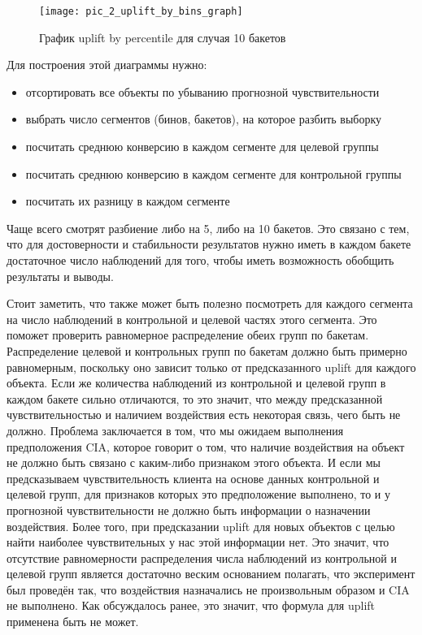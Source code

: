\begin{figure}[ht]
\centering
\texttt{[image: pic\_2\_uplift\_by\_bins\_graph]}
\centering
\caption{График uplift by percentile для случая 10 бакетов}
\label{fig:pic_2_uplift_by_bins_graph}
\end{figure}

Для построения этой диаграммы нужно:
\begin{itemize}
    \item отсортировать все объекты по убыванию прогнозной чувствительности
    \item выбрать число сегментов (бинов, бакетов), на которое разбить выборку
    \item посчитать среднюю конверсию в каждом сегменте для целевой группы
    \item посчитать среднюю конверсию в каждом сегменте для контрольной группы
    \item посчитать их разницу в каждом сегменте
\end{itemize}

Чаще всего смотрят разбиение либо на 5, либо на 10 бакетов. Это связано с тем, что для достоверности и стабильности результатов нужно иметь в каждом бакете достаточное число наблюдений для того, чтобы иметь возможность обобщить результаты и выводы.

Стоит заметить, что также может быть полезно посмотреть для каждого сегмента на число наблюдений в контрольной и целевой частях этого сегмента. Это поможет проверить равномерное распределение обеих групп по бакетам. Распределение целевой и контрольных групп по бакетам должно быть примерно равномерным, поскольку оно зависит только от предсказанного uplift для каждого объекта. Если же количества наблюдений из контрольной и целевой групп в каждом бакете сильно отличаются, то это значит, что между предсказанной чувствительностью и наличием воздействия есть некоторая связь, чего быть не должно. Проблема заключается в том, что мы ожидаем выполнения предположения CIA, которое говорит о том, что наличие воздействия на объект не должно быть связано с каким-либо признаком этого объекта. И если мы предсказываем чувствительность клиента на основе данных контрольной и целевой групп, для признаков которых это предположение выполнено, то и у прогнозной чувствительности не должно быть информации о назначении воздействия. Более того, при предсказании uplift для новых объектов с целью найти наиболее чувствительных у нас этой информации нет. Это значит, что отсутствие равномерности распределения числа наблюдений из контрольной и целевой групп является достаточно веским основанием полагать, что эксперимент был проведён так, что воздействия назначались не произвольным образом и CIA не выполнено. Как обсуждалось ранее, это значит, что формула для uplift применена быть не может.

